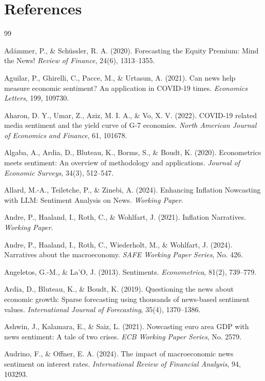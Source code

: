 \documentclass[11pt,twocolumn]{article}
\begin{document}
\section*{References}

\begin{thebibliography}{99}

 Ad\"ammer, P., \& Sch\"ussler, R. A. (2020). Forecasting the Equity Premium: Mind the News! \textit{Review of Finance}, 24(6), 1313--1355.

 Aguilar, P., Ghirelli, C., Pacce, M., \& Urtasun, A. (2021). Can news help measure economic sentiment? An application in COVID-19 times. \textit{Economics Letters}, 199, 109730.

 Aharon, D. Y., Umar, Z., Aziz, M. I. A., \& Vo, X. V. (2022). COVID-19 related media sentiment and the yield curve of G-7 economies. \textit{North American Journal of Economics and Finance}, 61, 101678.

 Algaba, A., Ardia, D., Bluteau, K., Borms, S., \& Boudt, K. (2020). Econometrics meets sentiment: An overview of methodology and applications. \textit{Journal of Economic Surveys}, 34(3), 512--547.

 Allard, M.-A., Teiletche, P., \& Zinebi, A. (2024). Enhancing Inflation Nowcasting with LLM: Sentiment Analysis on News. \textit{Working Paper}.

 Andre, P., Haaland, I., Roth, C., \& Wohlfart, J. (2021). Inflation Narratives. \textit{Working Paper}.

 Andre, P., Haaland, I., Roth, C., Wiederholt, M., \& Wohlfart, J. (2024). Narratives about the macroeconomy. \textit{SAFE Working Paper Series}, No. 426.

 Angeletos, G.-M., \& La'O, J. (2013). Sentiments. \textit{Econometrica}, 81(2), 739--779.

 Ardia, D., Bluteau, K., \& Boudt, K. (2019). Questioning the news about economic growth: Sparse forecasting using thousands of news-based sentiment values. \textit{International Journal of Forecasting}, 35(4), 1370--1386.

 Ashwin, J., Kalamara, E., \& Saiz, L. (2021). Nowcasting euro area GDP with news sentiment: A tale of two crises. \textit{ECB Working Paper Series}, No. 2579.

 Audrino, F., \& Offner, E. A. (2024). The impact of macroeconomic news sentiment on interest rates. \textit{International Review of Financial Analysis}, 94, 103293.


\end{thebibliography}
\end{document}
